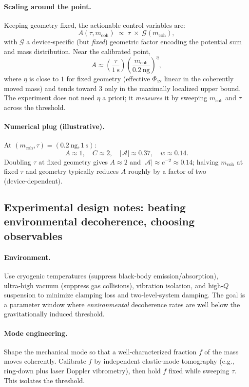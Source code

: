 \documentclass[11pt,letterpaper]{article}
\theoremstyle{definition}
\begin{document}
\paragraph{Scaling around the point.}
Keeping geometry fixed, the actionable control variables are:
\[
A(\tau,m_{\mathrm{coh}})\;\propto\;\tau\;\times\;\mathcal G(m_{\mathrm{coh}}),
\]
with $\mathcal G$ a device‑specific (but \emph{fixed}) geometric factor encoding the potential sum and mass distribution. Near the calibrated point, 
\[
A\approx \left(\frac{\tau}{1~\mathrm{s}}\right)\!\left(\frac{m_{\mathrm{coh}}}{0.2~\mathrm{ng}}\right)^{\!\eta},
\]
where $\eta$ is close to $1$ for fixed geometry (effective $\Phi_{12}$ linear in the coherently moved mass) and tends toward $3$ only in the maximally localized upper bound. The experiment does not need $\eta$ a priori; it \emph{measures} it by sweeping $m_{\mathrm{coh}}$ and $\tau$ across the threshold. %
\paragraph{Numerical plug (illustrative).} 
At $(m_{\mathrm{coh}},\tau)=(0.2~\mathrm{ng},1~\mathrm{s})$:
\[
A\approx 1,\quad C\approx 2,\quad 
|\mathcal A|\approx 0.37,\quad
w\approx 0.14.
\]
Doubling $\tau$ at fixed geometry gives $A\approx 2$ and $|\mathcal A|\approx e^{-2}\approx 0.14$; halving $m_{\mathrm{coh}}$ at fixed $\tau$ and geometry typically reduces $A$ roughly by a factor of two (device‑dependent). %
\subsection{Experimental design notes: beating environmental decoherence, choosing observables}

\paragraph{Environment.}
Use cryogenic temperatures (suppress black‑body emission/absorption), ultra‑high vacuum (suppress gas collisions), vibration isolation, and high‑$Q$ suspension to minimize clamping loss and two‑level‑system damping. The goal is a parameter window where \emph{environmental} decoherence rates are well below the gravitationally induced threshold. %
\paragraph{Mode engineering.}
Shape the mechanical mode so that a well‑characterized fraction $f$ of the mass moves coherently. Calibrate $f$ by independent elastic‑mode tomography (e.g., ring‑down plus laser Doppler vibrometry), then hold $f$ fixed while sweeping $\tau$. This isolates the threshold. %
\end{document}
